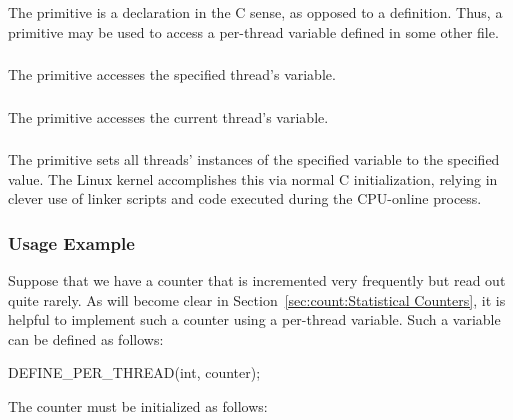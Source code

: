 \subsubsection{}

The  primitive is a declaration in the C sense,
as opposed to a definition.
Thus, a  primitive may be used to access
a per-thread variable defined in some other file.

\subsubsection{}

The  primitive accesses the specified thread's variable.

\subsubsection{}

The  primitive accesses the current thread's variable.

\subsubsection{}

The  primitive sets all threads' instances of
the specified variable to the specified value.
The Linux kernel accomplishes this via normal C initialization,
relying in clever use of linker scripts and code executed during
the CPU-online process.

\subsubsection{Usage Example}

Suppose that we have a counter that is incremented very frequently
but read out quite rarely.
As will become clear in
Section~\ref{sec:count:Statistical Counters},
it is helpful to implement such a counter using a per-thread variable.
Such a variable can be defined as follows:

\begin{VerbatimU}
DEFINE_PER_THREAD(int, counter);
\end{VerbatimU}

The counter must be initialized as follows:

